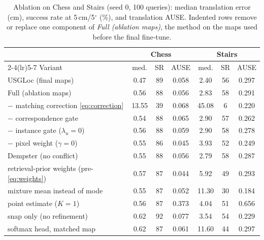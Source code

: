 \documentclass[journal]{IEEEtran}
\newcommand{\method}{USGLoc}
\begin{document}
\begin{table}[t]
\centering
\caption{Ablation on Chess and Stairs (seed 0, 100 queries): median translation error (cm), success rate at 5\,cm/5$^\circ$ (\%), and translation AUSE. Indented rows remove or replace one component of \emph{Full (ablation maps)}, the method on the maps used before the final fine-tune.}
\label{tab:ablation}
\setlength{\tabcolsep}{3pt}
\scriptsize
\begin{tabular}{@{}lcccccc@{}}
\toprule
& \multicolumn{3}{c}{Chess} & \multicolumn{3}{c}{Stairs} \\
\cmidrule(lr){2-4}\cmidrule(lr){5-7}
Variant & med. & SR & AUSE & med. & SR & AUSE \\
\midrule
\method{} (final maps)                 & 0.47 & 89 & 0.058 & 2.40 & 56 & 0.297 \\
Full (ablation maps)                    & 0.56 & 88 & 0.056 & 2.83 & 58 & 0.291 \\
\quad $-$ matching correction \eqref{eq:correction} & 13.55 & 39 & 0.068 & 45.08 & 6 & 0.220 \\
\quad $-$ correspondence gate           & 0.54 & 88 & 0.065 & 2.90 & 57 & 0.262 \\
\quad $-$ instance gate ($\lambda_u{=}0$) & 0.56 & 88 & 0.059 & 2.90 & 58 & 0.278 \\
\quad $-$ pixel weight ($\gamma{=}0$)   & 0.55 & 86 & 0.045 & 3.93 & 52 & 0.249 \\
\quad Dempster (no conflict)            & 0.55 & 88 & 0.056 & 2.79 & 58 & 0.287 \\
\quad retrieval-prior weights (pre-\eqref{eq:weights}) & 0.57 & 87 & 0.044 & 5.92 & 49 & 0.293 \\
\quad mixture mean instead of mode      & 0.55 & 87 & 0.052 & 11.30 & 30 & 0.184 \\
\quad point estimate ($K{=}1$)          & 0.56 & 87 & 0.373 & 4.04 & 51 & 0.656 \\
\quad snap only (no refinement)         & 0.62 & 92 & 0.077 & 3.54 & 54 & 0.229 \\
\quad softmax head, matched map          & 0.62 & 87 & 0.061 & 11.60 & 44 & 0.297 \\
\bottomrule
\end{tabular}
\end{table}
\end{document}
